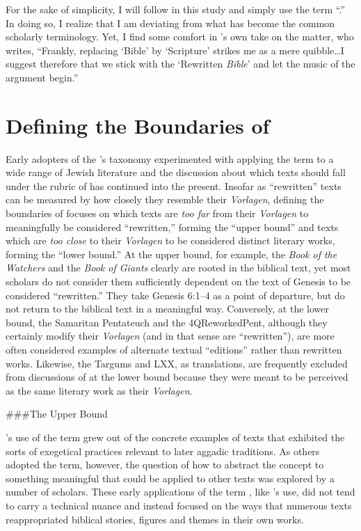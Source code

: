  For the sake of simplicity, I will follow \vermes in this study and simply use the term ``\RwB.'' In doing so, I realize that I am deviating from what has become the common scholarly terminology. Yet, I find some comfort in \vermes's own take on the matter, who writes, ``Frankly, replacing `Bible' by `Scripture' strikes me as a mere quibble\ldots{}I suggest therefore that we stick with the `Rewritten \emph{Bible}' and let the music of the argument begin.''\autocite[original emphasis]{vermes_zsengeller2014} 

 \hypertarget{defining-the-boundaries-of-rwb}{%
\section{Defining the Boundaries of \RWB}\label{defining-the-boundaries-of-rwb}} 

 Early adopters of the \vermes's taxonomy experimented with applying the term \rwb to a wide range of \secondtemple Jewish literature and the discussion about which texts should fall under the rubric of \rwb has continued into the present. Insofar as ``rewritten'' texts can be measured by how closely they resemble their \emph{Vorlagen}, defining the boundaries of \rwb focuses on which texts are \emph{too far} from their \emph{Vorlagen} to meaningfully be considered ``rewritten,'' forming the ``upper bound'' and texts which are \emph{too close} to their \emph{Vorlagen} to be considered distinct literary works, forming the ``lower bound.'' At the upper bound, for example, the \emph{Book of the Watchers} and the \emph{Book of Giants} clearly are rooted in the biblical text, yet most scholars do not consider them sufficiently dependent on the text of Genesis to be considered ``rewritten.'' They take Genesis 6:1--4 as a point of departure, but do not return to the biblical text in a meaningful way. Conversely, at the lower bound, the Samaritan Pentateuch and the 4QReworkedPent, although they certainly modify their \emph{Vorlagen} (and in that sense are ``rewritten''), are more often considered examples of alternate textual ``editions'' rather than rewritten works. Likewise, the Targums and LXX, as translations, are frequently excluded from discussions of \rwb at the lower bound because they were meant to be perceived as the same literary work as their \emph{Vorlagen}. 

 \#\#\#The Upper Bound 

 \vermes's use of the term \rwb grew out of the concrete examples of texts that exhibited the sorts of exegetical practices relevant to later aggadic traditions. As others adopted the term, however, the question of how to abstract the concept to something meaningful that could be applied to other texts was explored by a number of scholars. These early applications of the term \rwb, like \vermes's use, did not tend to carry a technical nuance and instead focused on the ways that numerous texts reappropriated biblical stories, figures and themes in their own works. 

